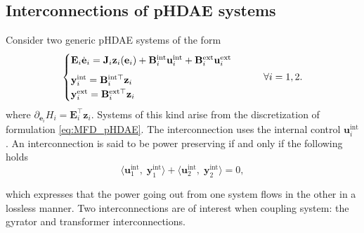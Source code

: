 \documentclass{svjour3}                     %
\begin{document}
	\subsection{Interconnections of pHDAE systems}
	Consider two generic pHDAE systems of the form
	\begin{equation}
	\begin{cases}
	\mathbf{E}_i \dot{\mathbf{e}}_i = \mathbf{J}_i \mathbf{z}_i(\mathbf{e}_i) + \mathbf{B}_i^{\text{int}} \mathbf{u}_i^{\text{int}} + \mathbf{B}_i^{\text{ext}} \mathbf{u}_i^{\text{ext}}  \vspace{2mm} \\
	\mathbf{y}_i^{\text{int}} = \mathbf{B}_i^{\text{int} \top}  \mathbf{z}_i \\
	\mathbf{y}_i^{\text{ext}} = \mathbf{B}_i^{\text{ext} \top}  \mathbf{z}_i \\
	\end{cases} \qquad \forall i = 1, 2.
	\end{equation}
	where $\partial_{\mathbf{e}_i} {H_i} = \mathbf{E}_i^\top \mathbf{z}_i$. Systems of this kind arise from the discretization of formulation \eqref{eq:MFD_pHDAE}. The interconnection uses the internal control $\mathbf{u}_i^{\text{int}}$. An interconnection is said to be power preserving if and only if the following holds
	\begin{equation} \label{eq:int_balance}
	\langle \mathbf{u}_1^{\text{int}}, \; \mathbf{y}_1^{\text{int}} \rangle + \langle \mathbf{u}_2^{\text{int}}, \; \mathbf{y}_2^{\text{int}} \rangle = 0,
	\end{equation}
	
	which expresses that the power going out from one system flows in the other in a lossless manner. Two interconnections are of interest when coupling system: the gyrator and transformer interconnections.
	
\end{document}
